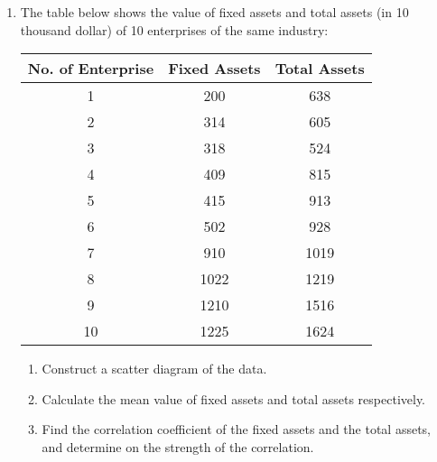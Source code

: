 \documentclass{report}
\begin{document}
\begin{multicols}{2}
  \begin{enumerate}
    \item The table below shows the value of fixed assets and total assets (in 10
          thousand dollar) of 10 enterprises of the same industry:
          \begin{center}
            \begin{tabular}{|c|c|c|}
              \hline
              No. of Enterprise & Fixed Assets & Total Assets \\
              \hline
              1                 & 200          & 638          \\
              2                 & 314          & 605          \\
              3                 & 318          & 524          \\
              4                 & 409          & 815          \\
              5                 & 415          & 913          \\
              6                 & 502          & 928          \\
              7                 & 910          & 1019         \\
              8                 & 1022         & 1219         \\
              9                 & 1210         & 1516         \\
              10                & 1225         & 1624         \\
              \hline
            \end{tabular}
          \end{center}
          \begin{enumerate}
            \item Construct a scatter diagram of the data.
            \item Calculate the mean value of fixed assets and total assets respectively.
            \item Find the correlation coefficient of the fixed assets and the total assets, and
                  determine on the strength of the correlation.
          \end{enumerate}


\end{enumerate}
\end{multicols}
\end{document}
